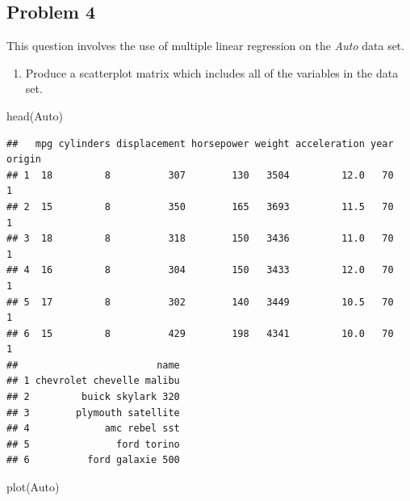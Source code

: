 \documentclass[
]{article}
\newenvironment{Shaded}{\begin{snugshade}}{\end{snugshade}}
\newcommand{\FunctionTok}[1]{\textcolor[rgb]{0.00,0.00,0.00}{#1}}
\newcommand{\NormalTok}[1]{#1}
\providecommand{\tightlist}{%
  \setlength{\itemsep}{0pt}\setlength{\parskip}{0pt}}
\begin{document}
\hypertarget{problem-4}{%
\subsection{Problem 4}\label{problem-4}}

This question involves the use of multiple linear regression on the
\emph{Auto} data set.

\begin{enumerate}
\def\labelenumi{(\alph{enumi})}
\tightlist
\item
  Produce a scatterplot matrix which includes all of the variables in
  the data set.
\end{enumerate}

\begin{Shaded}
\begin{Highlighting}[]
\FunctionTok{head}\NormalTok{(Auto)}
\end{Highlighting}
\end{Shaded}

\begin{verbatim}
##   mpg cylinders displacement horsepower weight acceleration year origin
## 1  18         8          307        130   3504         12.0   70      1
## 2  15         8          350        165   3693         11.5   70      1
## 3  18         8          318        150   3436         11.0   70      1
## 4  16         8          304        150   3433         12.0   70      1
## 5  17         8          302        140   3449         10.5   70      1
## 6  15         8          429        198   4341         10.0   70      1
##                        name
## 1 chevrolet chevelle malibu
## 2         buick skylark 320
## 3        plymouth satellite
## 4             amc rebel sst
## 5               ford torino
## 6          ford galaxie 500
\end{verbatim}

\begin{Shaded}
\begin{Highlighting}[]
\FunctionTok{plot}\NormalTok{(Auto)}
\end{Highlighting}
\end{Shaded}
\end{document}
